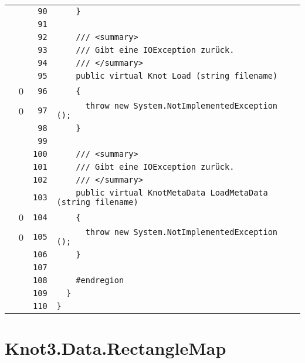 \documentclass[a4paper,10pt]{article}
\begin{document}
\begin{longtable}[l]{lrrl}
\cellcolor{gray} &  & \verb~90~ & \verb~    }~\\
\cellcolor{gray} &  & \verb~91~ & \verb~~\\
\cellcolor{gray} &  & \verb~92~ & \verb~    /// <summary>~\\
\cellcolor{gray} &  & \verb~93~ & \verb~    /// Gibt eine IOException zurück.~\\
\cellcolor{gray} &  & \verb~94~ & \verb~    /// </summary>~\\
\cellcolor{gray} &  & \verb~95~ & \verb~    public virtual Knot Load (string filename)~\\
\cellcolor{red} & 0 & \verb~96~ & \verb~    {~\\
\cellcolor{red} & 0 & \verb~97~ & \verb~      throw new System.NotImplementedException ();~\\
\cellcolor{gray} &  & \verb~98~ & \verb~    }~\\
\cellcolor{gray} &  & \verb~99~ & \verb~~\\
\cellcolor{gray} &  & \verb~100~ & \verb~    /// <summary>~\\
\cellcolor{gray} &  & \verb~101~ & \verb~    /// Gibt eine IOException zurück.~\\
\cellcolor{gray} &  & \verb~102~ & \verb~    /// </summary>~\\
\cellcolor{gray} &  & \verb~103~ & \verb~    public virtual KnotMetaData LoadMetaData (string filename)~\\
\cellcolor{red} & 0 & \verb~104~ & \verb~    {~\\
\cellcolor{red} & 0 & \verb~105~ & \verb~      throw new System.NotImplementedException ();~\\
\cellcolor{gray} &  & \verb~106~ & \verb~    }~\\
\cellcolor{gray} &  & \verb~107~ & \verb~~\\
\cellcolor{gray} &  & \verb~108~ & \verb~    #endregion~\\
\cellcolor{gray} &  & \verb~109~ & \verb~  }~\\
\cellcolor{gray} &  & \verb~110~ & \verb~}~\\
\end{longtable}
\newpage
\section{Knot3.Data.RectangleMap}
\end{document}
